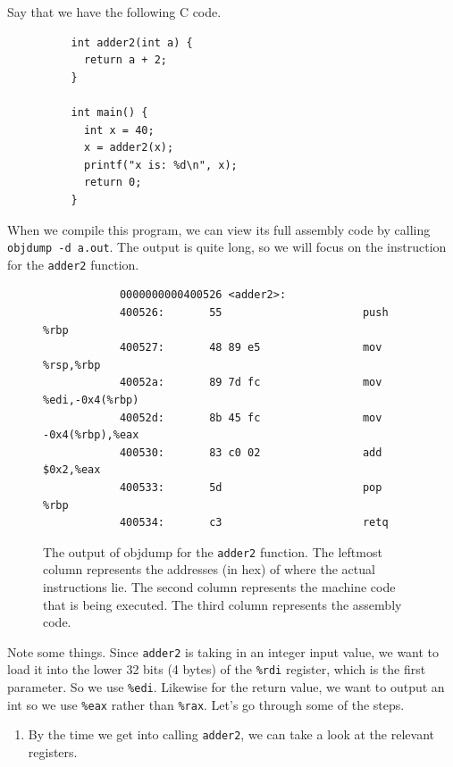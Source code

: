 \documentclass{article}
\begin{document}
      \begin{example}
        Say that we have the following C code. 
        \begin{lstlisting}
          int adder2(int a) {
            return a + 2; 
          }

          int main() {
            int x = 40; 
            x = adder2(x); 
            printf("x is: %d\n", x);
            return 0; 
          }
        \end{lstlisting}
        When we compile this program, we can view its full assembly code by calling \texttt{objdump -d a.out}. The output is quite long, so we will focus on the instruction for the \texttt{adder2} function. 
        \begin{figure}[H]
          \centering 
          \begin{lstlisting}
            0000000000400526 <adder2>:
            400526:       55                      push   %rbp
            400527:       48 89 e5                mov    %rsp,%rbp
            40052a:       89 7d fc                mov    %edi,-0x4(%rbp)
            40052d:       8b 45 fc                mov    -0x4(%rbp),%eax
            400530:       83 c0 02                add    $0x2,%eax
            400533:       5d                      pop    %rbp
            400534:       c3                      retq
          \end{lstlisting}
          \caption{The output of objdump for the \texttt{adder2} function. The leftmost column represents the addresses (in hex) of where the actual instructions lie. The second column represents the machine code that is being executed. The third column represents the assembly code.}
          \label{fig:adder2} 
        \end{figure}
        Note some things. Since \texttt{adder2} is taking in an integer input value, we want to load it into the lower 32 bits (4 bytes) of the \texttt{\%rdi} register, which is the first parameter. So we use \texttt{\%edi}. Likewise for the return value, we want to output an int so we use \texttt{\%eax} rather than \texttt{\%rax}. Let's go through some of the steps. 
        \begin{enumerate}
          \item By the time we get into calling \texttt{adder2}, we can take a look at the relevant registers. 


\end{enumerate}
\end{example}
\end{document}
